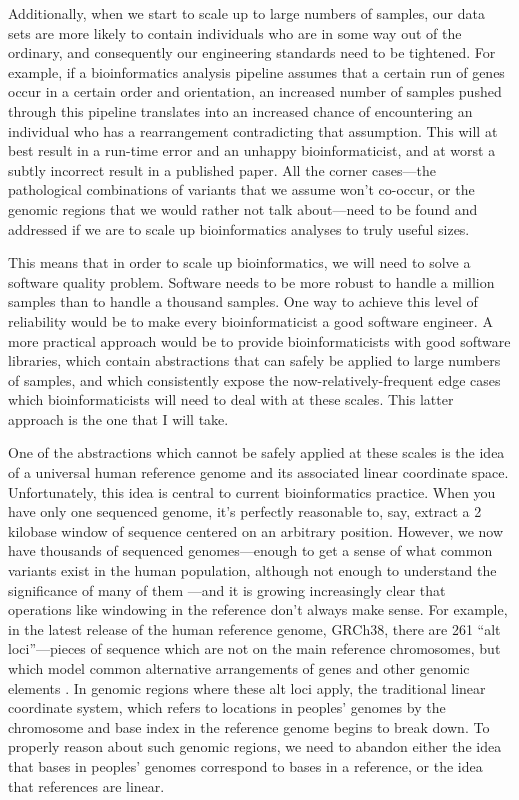 \documentclass[11pt,proposal]{ucthesis}
\begin{document}
Additionally, when we start to scale up to large numbers of samples, our data sets are more likely to contain individuals who are in some way out of the ordinary, and consequently our engineering standards need to be tightened. For example, if a bioinformatics analysis pipeline assumes that a certain run of genes occur in a certain order and orientation, an increased number of samples pushed through this pipeline translates into an increased chance of encountering an individual who has a rearrangement contradicting that assumption. This will at best result in a run-time error and an unhappy bioinformaticist, and at worst a subtly incorrect result in a published paper. All the corner cases---the pathological combinations of variants that we assume won't co-occur, or the genomic regions that we would rather not talk about---need to be found and addressed if we are to scale up bioinformatics analyses to truly useful sizes.

This means that in order to scale up bioinformatics, we will need to solve a software quality problem. Software needs to be more robust to handle a million samples than to handle a thousand samples. One way to achieve this level of reliability would be to make every bioinformaticist a good software engineer. A more practical approach would be to provide bioinformaticists with good software libraries, which contain abstractions that can safely be applied to large numbers of samples, and which consistently expose the now-relatively-frequent edge cases which bioinformaticists will need to deal with at these scales. This latter approach is the one that I will take.

One of the abstractions which cannot be safely applied at these scales is the idea of a universal human reference genome and its associated linear coordinate space. Unfortunately, this idea is central to current bioinformatics practice. When you have only one sequenced genome, it's perfectly reasonable to, say, extract a 2 kilobase window of sequence centered on an arbitrary position. However, we now have thousands of sequenced genomes---enough to get a sense of what common variants exist in the human population, although not enough to understand the significance of many of them \cite{10002010map}---and it is growing increasingly clear that operations like windowing in the reference don't always make sense. For example, in the latest release of the human reference genome, GRCh38, there are 261 ``alt loci''---pieces of sequence which are not on the main reference chromosomes, but which model common alternative arrangements of genes and other genomic elements \cite{karolchik2014new}. In genomic regions where these alt loci apply, the traditional linear coordinate system, which refers to locations in peoples' genomes by the chromosome and base index in the reference genome begins to break down. To properly reason about such genomic regions, we need to abandon either the idea that bases in peoples' genomes correspond to bases in a reference, or the idea that references are linear.
\end{document}
